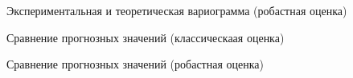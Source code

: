 \begin{figure}[H]
\caption{Экспериментальная и теоретическая вариограмма (робастная оценка)}
\label{img:robust-variogram}
\end{figure}

\begin{figure}[H]
\caption{Сравнение прогнозных значений (классическаая оценка)}
\label{img:classical-best-cross-prediction}
\end{figure}

\begin{figure}[H]
\caption{Сравнение прогнозных значений (робастная оценка)}
\label{img:robust-best-cross-prediction}
\end{figure}

